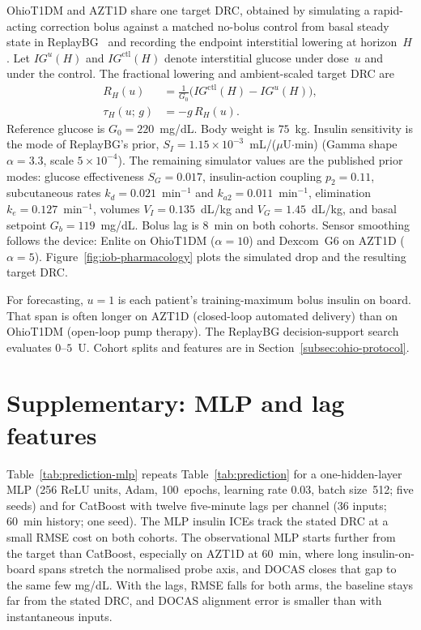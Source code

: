 \documentclass[a4paper,fleqn]{cas-sc}
\begin{document}
OhioT1DM and AZT1D share one target DRC, obtained by simulating a rapid-acting
correction bolus against a matched no-bolus control from basal steady state in
ReplayBG~\citep{cappon2023} and recording the endpoint interstitial lowering at
horizon~$H$. Let $IG^{u}(H)$ and $IG^{\mathrm{ctl}}(H)$ denote interstitial
glucose under dose~$u$ and under the control. The fractional lowering and
ambient-scaled target DRC are
\begin{equation}
  \begin{aligned}
    R_H(u)
    &=
    \frac{1}{G_0}
    \bigl(IG^{\mathrm{ctl}}(H)-IG^{u}(H)\bigr),
    \\[0.35em]
    \tau_H(u;\,g)
    &=
    -g\,R_H(u).
  \end{aligned}
  \label{eq:target}
\end{equation}
Reference glucose is $G_0{=}220$~mg/dL. Body weight is $75$~kg. Insulin
sensitivity is the mode of ReplayBG's prior,
$S_I{=}1.15{\times}10^{-3}$~mL/($\mu$U$\cdot$min) (Gamma shape $\alpha{=}3.3$,
scale $5{\times}10^{-4}$). The remaining simulator values are the published
prior modes: glucose effectiveness $S_G{=}0.017$, insulin-action coupling
$p_2{=}0.11$, subcutaneous rates $k_d{=}0.021$~min$^{-1}$ and
$k_{a2}{=}0.011$~min$^{-1}$, elimination $k_e{=}0.127$~min$^{-1}$, volumes
$V_I{=}0.135$~dL/kg and $V_G{=}1.45$~dL/kg, and basal setpoint
$G_b{=}119$~mg/dL. Bolus lag is $8$~min on both cohorts. Sensor smoothing
follows the device: Enlite on OhioT1DM ($\alpha{=}10$) and Dexcom~G6 on AZT1D
($\alpha{=}5$). Figure~\ref{fig:iob-pharmacology} plots the simulated drop and
the resulting target DRC.

For forecasting, $u{=}1$ is each patient's training-maximum bolus insulin on
board. That span is often longer on AZT1D (closed-loop automated delivery) than
on OhioT1DM (open-loop pump therapy). The ReplayBG decision-support search
evaluates $0$--$5$~U. Cohort splits and features are in
Section~\ref{subsec:ohio-protocol}.

\section{Supplementary: MLP and lag features}\label{app:mlp}\label{app:lags}

Table~\ref{tab:prediction-mlp} repeats Table~\ref{tab:prediction} for a one-hidden-layer MLP (256 ReLU units, Adam, 100~epochs, learning rate $0.03$, batch size~512; five seeds) and for CatBoost with twelve five-minute lags per channel (36 inputs; 60~min history; one seed). The MLP insulin ICEs track the stated DRC at a small RMSE cost on both cohorts. The observational MLP starts further from the target than CatBoost, especially on AZT1D at 60~min, where long insulin-on-board spans stretch the normalised probe axis, and DOCAS closes that gap to the same few mg/dL. With the lags, RMSE falls for both arms, the baseline stays far from the stated DRC, and DOCAS alignment error is smaller than with instantaneous inputs.
\end{document}
